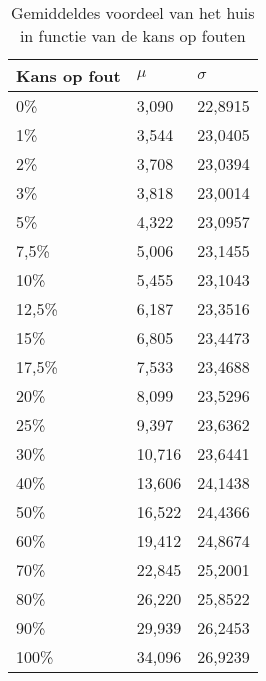 \documentclass[conference]{IEEEtran}
\begin{document}
\begin{table}
\centering
\begin{tabular}{|l|l|l|}
\hline
Kans op fout & $\mu$ & $\sigma$\\
\hline
0\% & 3,090 & 22,8915\\
1\% & 3,544 & 23,0405\\
2\% & 3,708 & 23,0394\\
3\% & 3,818 & 23,0014\\
5\% & 4,322 & 23,0957\\
7,5\% & 5,006 & 23,1455\\
10\% & 5,455 & 23,1043\\
12,5\% & 6,187 & 23,3516\\
15\% & 6,805 & 23,4473\\
17,5\% & 7,533 & 23,4688\\
20\% & 8,099 & 23,5296\\
25\% & 9,397 & 23,6362\\
30\% & 10,716 & 23,6441\\
40\% & 13,606 & 24,1438\\
50\% & 16,522 & 24,4366\\
60\% & 19,412 & 24,8674\\
70\% & 22,845 & 25,2001\\
80\% & 26,220 & 25,8522\\
90\% & 29,939 & 26,2453\\
100\% & 34,096 & 26,9239\\
\hline
\end{tabular}
\caption{Gemiddeldes voordeel van het huis in functie van de kans op fouten}
\label{tab:gemiddeldesMiskansen}
\end{table}

%
%
\end{document}
